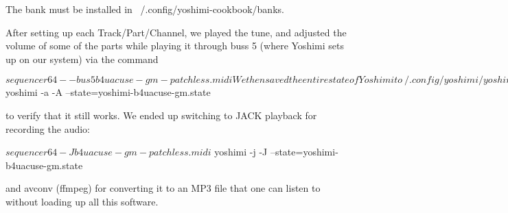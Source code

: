 The bank must be installed in ~/.config/yoshimi-cookbook/banks.

After setting up each Track/Part/Channel, we played the tune, and adjusted the
volume of some of the parts while playing it through buss 5 (where Yoshimi sets
up on our system) via the command

   $ sequencer64 --bus 5 b4uacuse-gm-patchless.midi
   
We then saved the entire state of Yoshimi to
~/.config/yoshimi/yoshimi-b4uacuse-gm.state via Menu / State / Save ....  We
reload this file via

   $ yoshimi -a -A --state=yoshimi-b4uacuse-gm.state
   
to verify that it still works.  We ended up switching to JACK playback for
recording the audio:

   $ sequencer64 -J b4uacuse-gm-patchless.midi
   $ yoshimi -j -J --state=yoshimi-b4uacuse-gm.state

and avconv (ffmpeg) for converting it to an MP3 file that one can listen to
without loading up all this software.

